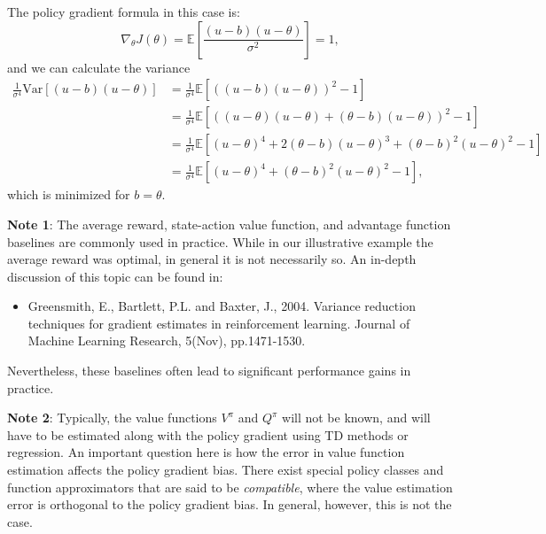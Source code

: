 The policy gradient formula in this case is:
\begin{equation*}
        \nabla_\theta J(\theta) = \mathbb{E} \left[\frac{(u-b)(u - \theta)}{\sigma^2}\right] = 1, 
\end{equation*}
and we can calculate the variance
\begin{equation*}
\begin{split}
        \frac{1}{\sigma^4}\textrm{Var}\left[(u-b)(u - \theta)\right]  
        &=\frac{1}{\sigma^4}\mathbb{E}\left[\left((u-b)(u - \theta)\right)^2 - 1\right] \\
        &=\frac{1}{\sigma^4}\mathbb{E}\left[\left((u-\theta)(u - \theta) + (\theta-b)(u - \theta)\right)^2 - 1\right] \\
        &=\frac{1}{\sigma^4}\mathbb{E}\left[(u-\theta)^4 + 2(\theta-b)(u - \theta)^3 + (\theta-b)^2(u - \theta)^2 - 1\right] \\
        &=\frac{1}{\sigma^4}\mathbb{E}\left[(u-\theta)^4 + (\theta-b)^2(u - \theta)^2 - 1\right],
\end{split}
\end{equation*}
which is minimized for $b=\theta$.

\textbf{Note 1}: The average reward, state-action value function, and advantage function baselines are commonly used in practice. While in our illustrative example the average reward was optimal, in general it is not necessarily so. An in-depth discussion of this topic can be found in:  
\begin{itemize}
  \item Greensmith, E., Bartlett, P.L. and Baxter, J., 2004. Variance reduction techniques for gradient estimates in reinforcement learning. Journal of Machine Learning Research, 5(Nov), pp.1471-1530.
\end{itemize}
Nevertheless, these baselines often lead to significant performance gains in practice.

\textbf{Note 2}: Typically, the value functions $V^\pi$ and $Q^\pi$ will not be known, and will have to be estimated along with the policy gradient using TD methods or regression. An important question here is how the error in value function estimation affects the policy gradient bias. There exist special policy classes and function approximators that are said to be \textit{compatible}, where the value estimation error is orthogonal to the policy gradient bias. In general, however, this is not the case. 


